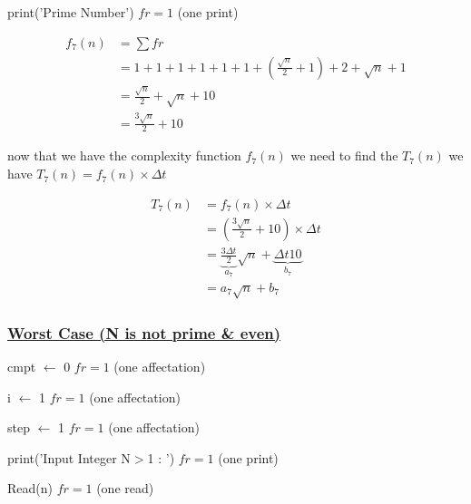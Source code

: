 \vspace{0.15cm}

\textcolor{purplePlot!80!black}{print}(\textcolor{blueArea!60!black}{'Prime Number'}) \hspace{1.95cm} \(fr = 1\) (one print)

\vspace{0.75cm}
\begin{align*}
f_7(n) &= \sum fr \\
       &= 1 + 1 + 1 + 1 + 1 + 1 + (\frac{\sqrt{n}}{2}+1) + 2 + \sqrt{n} + 1 \\
       &= \frac{\sqrt{n}}{2} + \sqrt{n} + 10 \\
       &= \boxed{\frac{3\sqrt{n}}{2} + 10}
\end{align*}

\vspace{0.5cm}
now that we have the complexity function \(f_7(n)\) we need to find the \(T_7(n)\)  we have \(T_7(n) = f_7(n) \times \Delta t\)

\begin{align*}
T_7(n) &= f_7(n) \times \Delta t\\ 
       &= (\frac{3\sqrt{n}}{2} + 10) \times \Delta t \\
       &= \underbrace{\frac{3\Delta t}{2}}_{a_7} \sqrt{n} + \underbrace{\Delta t 10}_{b_7} \\
&= \boxed{a_7\sqrt{n}+b_7} 
\end{align*}

\subsubsection*{\underline{Worst Case (N is not prime \& even)}}

cmpt $\gets$ 0  \hspace{4cm} \(fr = 1\) (one affectation)

\vspace{0.15cm}
i $\gets$ 1  \hspace{4.65cm} \(fr = 1\) (one affectation)

\vspace{0.15cm}
step $\gets$ 1  \hspace{4.1cm} \(fr = 1\) (one affectation)


\vspace{0.15cm}
\textcolor{purplePlot!80!black}{print}(\textcolor{blueArea!60!black}{'Input Integer N\(>\)1 : '})  \hspace{0.95cm} \(fr = 1\) (one print)

\vspace{0.15cm}
\textcolor{purplePlot!80!black}{Read}(n)  \hspace{4.25cm} \(fr = 1\) (one read)

